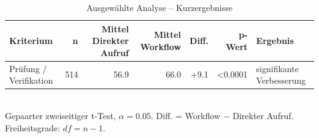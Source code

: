 \begin{table}[htbp]
\centering
\caption{Ausgewählte Analyse -- Kurzergebnisse}
\begin{tabular}{lrrrrrl}
\toprule
Kriterium & n & Mittel Direkter Aufruf & Mittel Workflow & Diff. & p-Wert & Ergebnis \\
\midrule
Prüfung / Verifikation & 514 & 56.9 & 66.0 & +9.1 & <0.0001 & signifikante Verbesserung \\
\bottomrule
\end{tabular}
\\[2mm]
\footnotesize Gepaarter zweiseitiger t-Test, $\alpha=0.05$. Diff. = Workflow $-$ Direkter Aufruf. Freiheitsgrade: $df=n-1$.
\end{table}

